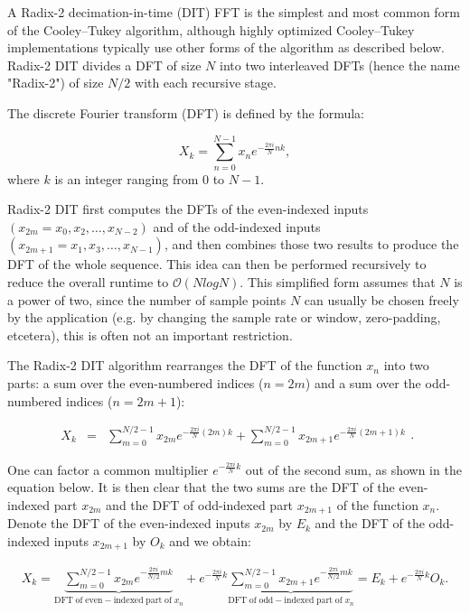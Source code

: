 \documentclass[12pt]{article}
\theoremstyle{plain}
\begin{document}
A Radix-2 decimation-in-time (DIT) FFT is the simplest and most common form of the Cooley–Tukey algorithm, although highly optimized Cooley–Tukey implementations typically use other forms of the algorithm as described below. Radix-2 DIT divides a DFT of size $N$ into two interleaved DFTs (hence the name "Radix-2") of size $N/2$ with each recursive stage.

The discrete Fourier transform (DFT) is defined by the formula:

\begin{equation}
X_k = \sum_{n=0}^{N-1} x_n e^{-\frac{2\pi i}{N} nk},
\end{equation}
where $k$ is an integer ranging from $0$ to $N-1$.

Radix-2 DIT first computes the DFTs of the even-indexed inputs
$(x_{2m}=x_0, x_2, \ldots, x_{N-2})$ and of the odd-indexed inputs $(x_{2m+1}=x_1, x_3, \ldots, x_{N-1})$, and then combines those two results to produce the DFT of the whole sequence. This idea can then be performed recursively to reduce the overall runtime to $\mathcal{O}(N log N)$. This simplified form assumes that $N$ is a power of two, since the number of sample points $N$ can usually be chosen freely by the application (e.g. by changing the sample rate or window, zero-padding, etcetera), this is often not an important restriction.

The Radix-2 DIT algorithm rearranges the DFT of the function $x_n$ into two parts: a sum over the even-numbered indices ($n={2m}$) and a sum over the odd-numbered indices ($n={2m+1}$):

\begin{equation}
\begin{matrix} X_k & =
& \sum \limits_{m=0}^{N/2-1} x_{2m}e^{-\frac{2\pi i}{N} (2m)k}   +   \sum \limits_{m=0}^{N/2-1} x_{2m+1} e^{-\frac{2\pi i}{N} (2m+1)k}
  \end{matrix}.
\end{equation}

One can factor a common multiplier $e^{-\frac{2\pi i}{N}k}$ out of the second sum, as shown in the equation below. It is then clear that the two sums are the DFT of the even-indexed part $x_{2m}$ and the DFT of odd-indexed part $x_{2m+1}$ of the function $x_n$. Denote the DFT of the even-indexed inputs $x_{2m}$ by $E_k$ and the DFT of the odd-indexed inputs $x_{2m + 1}$ by $O_k$ and we obtain:

\begin{equation}
\begin{matrix} X_k= \underbrace{\sum \limits_{m=0}^{N/2-1} x_{2m}   e^{-\frac{2\pi i}{N/2} mk}}_{\mathrm{DFT\;of\;even-indexed\;part\;of\;} x_n} {} +  e^{-\frac{2\pi i}{N}k}
 \underbrace{\sum \limits_{m=0}^{N/2-1} x_{2m+1} e^{-\frac{2\pi i}{N/2} mk}}_{\mathrm{DFT\;of\;odd-indexed\;part\;of\;} x_n} =  E_k + e^{-\frac{2\pi i}{N}k} O_k.
\end{matrix}
\end{equation}
\end{document}
